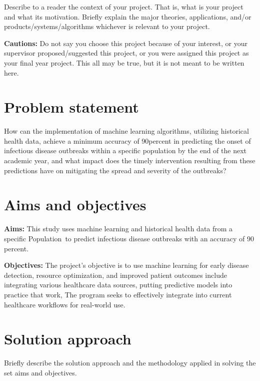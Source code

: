 Describe to a reader the context of your project. That is, what is your project and what its 
motivation. Briefly explain the major theories, applications, and/or 
products/systems/algorithms whichever is relevant to your project.

\textbf{Cautions:} Do not say you choose this project because of your interest, or your supervisor proposed/suggested this project, or you were assigned this project as your final year project. This all may be true, but it is not meant to be written here.

\section{Problem statement}
\label{sec:intro_prob_art}
How can the implementation of machine learning algorithms, utilizing historical health data, 
achieve a minimum accuracy of 90percent in predicting the onset of infectious disease outbreaks 
within a specific population by the end of the next academic year, and what impact does the 
timely intervention resulting from these predictions have on mitigating the spread and severity 
of the outbreaks?

\section{Aims and objectives}
\label{sec:intro_aims_obj}


\textbf{Aims:} This study uses machine learning and historical health data from a specific Population to predict infectious disease outbreaks with an accuracy of 90 percent.  

\textbf{Objectives:} The project's objective is to use machine learning for early disease detection, resource optimization, and improved patient outcomes include integrating various healthcare data sources, putting predictive models into practice that work, The program seeks to effectively integrate into current healthcare workflows for real-world use.



\section{Solution approach}
\label{sec:intro_sol} %
Briefly describe the solution approach and the methodology applied in solving the set aims and objectives.

